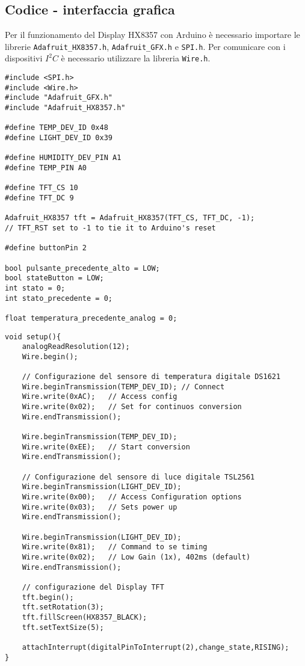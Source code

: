 \subsection{Codice - interfaccia grafica}
Per il funzionamento del Display HX8357 con Arduino è necessario importare le librerie \texttt{Adafruit\_HX8357.h}, \texttt{Adafruit\_GFX.h} e \texttt{SPI.h}. Per comunicare con i dispositivi $I^2C$ è necessario utilizzare la libreria \texttt{Wire.h}. 
\begin{lstlisting}[frame=single, language=Arduino]
#include <SPI.h>
#include <Wire.h>
#include "Adafruit_GFX.h"
#include "Adafruit_HX8357.h"

#define TEMP_DEV_ID 0x48
#define LIGHT_DEV_ID 0x39

#define HUMIDITY_DEV_PIN A1
#define TEMP_PIN A0

#define TFT_CS 10
#define TFT_DC 9

Adafruit_HX8357 tft = Adafruit_HX8357(TFT_CS, TFT_DC, -1); 
// TFT_RST set to -1 to tie it to Arduino's reset

#define buttonPin 2

bool pulsante_precedente_alto = LOW;
bool stateButton = LOW;
int stato = 0;
int stato_precedente = 0;

float temperatura_precedente_analog = 0;
\end{lstlisting}
\begin{lstlisting}[frame=single, language=Arduino]
void setup(){
    analogReadResolution(12);
    Wire.begin();

    // Configurazione del sensore di temperatura digitale DS1621
    Wire.beginTransmission(TEMP_DEV_ID); // Connect
    Wire.write(0xAC);   // Access config
    Wire.write(0x02);   // Set for continuos conversion
    Wire.endTransmission();

    Wire.beginTransmission(TEMP_DEV_ID);
    Wire.write(0xEE);   // Start conversion
    Wire.endTransmission();

    // Configurazione del sensore di luce digitale TSL2561
    Wire.beginTransmission(LIGHT_DEV_ID);
    Wire.write(0x00);   // Access Configuration options
    Wire.write(0x03);   // Sets power up
    Wire.endTransmission();

    Wire.beginTransmission(LIGHT_DEV_ID);
    Wire.write(0x81);   // Command to se timing
    Wire.write(0x02);   // Low Gain (1x), 402ms (default)
    Wire.endTransmission();

    // configurazione del Display TFT
    tft.begin();
    tft.setRotation(3);
    tft.fillScreen(HX8357_BLACK);
    tft.setTextSize(5);

    attachInterrupt(digitalPinToInterrupt(2),change_state,RISING);
}
\end{lstlisting}
